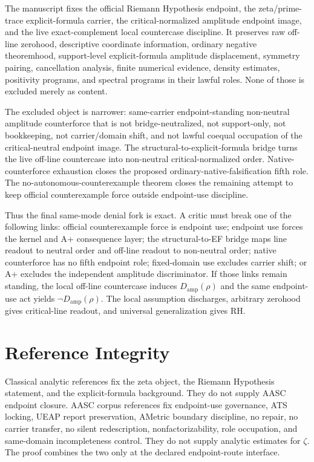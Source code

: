 \documentclass[11pt]{article}
\newcommand{\Damp}{D_{\mathrm{amp}}}
\begin{document}
The manuscript fixes the official Riemann Hypothesis endpoint, the zeta/prime-trace explicit-formula carrier, the critical-normalized amplitude endpoint image, and the live exact-complement local countercase discipline.  It preserves raw off-line zerohood, descriptive coordinate information, ordinary negative theoremhood, support-level explicit-formula amplitude displacement, symmetry pairing, cancellation analysis, finite numerical evidence, density estimates, positivity programs, and spectral programs in their lawful roles.  None of those is excluded merely as content.

The excluded object is narrower: same-carrier endpoint-standing non-neutral amplitude counterforce that is not bridge-neutralized, not support-only, not bookkeeping, not carrier/domain shift, and not lawful coequal occupation of the critical-neutral endpoint image.  The structural-to-explicit-formula bridge turns the live off-line countercase into non-neutral critical-normalized order.  Native-counterforce exhaustion closes the proposed ordinary-native-falsification fifth role.  The no-autonomous-counterexample theorem closes the remaining attempt to keep official counterexample force outside endpoint-use discipline.

Thus the final same-mode denial fork is exact.  A critic must break one of the following links: official counterexample force is endpoint use; endpoint use forces the kernel and A+ consequence layer; the structural-to-EF bridge maps line readout to neutral order and off-line readout to non-neutral order; native counterforce has no fifth endpoint role; fixed-domain use excludes carrier shift; or A+ excludes the independent amplitude discriminator.  If those links remain standing, the local off-line countercase induces \(\Damp(\rho)\) and the same endpoint-use act yields \(\neg\Damp(\rho)\).  The local assumption discharges, arbitrary zerohood gives critical-line readout, and universal generalization gives RH.

\section{Reference Integrity}

Classical analytic references fix the zeta object, the Riemann Hypothesis statement, and the explicit-formula background.  They do not supply AASC endpoint closure.  AASC corpus references fix endpoint-use governance, ATS locking, UEAP report preservation, AMetric boundary discipline, no repair, no carrier transfer, no silent redescription, nonfactorizability, role occupation, and same-domain incompleteness control.  They do not supply analytic estimates for \(\zeta\).  The proof combines the two only at the declared endpoint-route interface.
\end{document}
